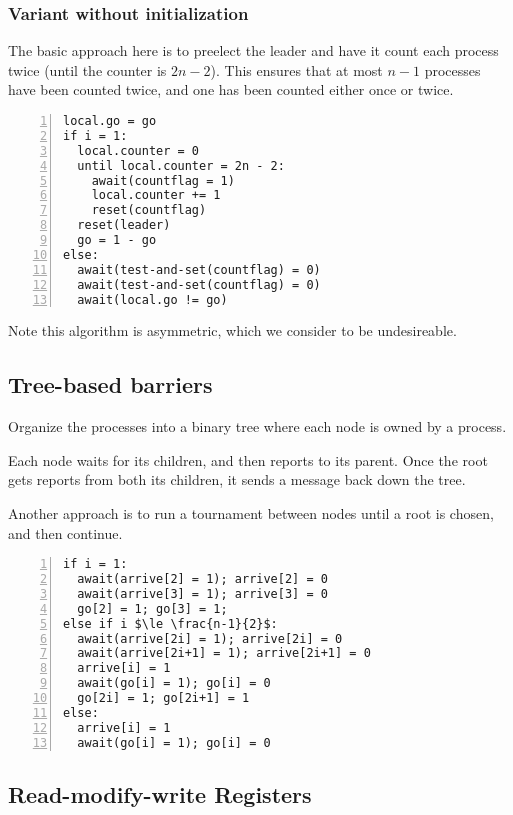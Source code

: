 \documentclass{idc_msc}
\begin{document}
\subsubsection{Variant without initialization}

The basic approach here is to preelect the leader and have it count each process twice (until the counter is $2n-2$).
This ensures that at most $n-1$ processes have been counted twice, and one has been counted either once or twice.

\begin{lstlisting}[frame=L,mathescape=true,numbers=left,title={For process i in 0...n}]
local.go = go
if i = 1:
  local.counter = 0
  until local.counter = 2n - 2:
    await(countflag = 1)
    local.counter += 1
    reset(countflag)
  reset(leader)
  go = 1 - go
else:
  await(test-and-set(countflag) = 0)
  await(test-and-set(countflag) = 0)
  await(local.go != go)
\end{lstlisting}

Note this algorithm is asymmetric, which we consider to be undesireable.

\subsection{Tree-based barriers}

Organize the processes into a binary tree where each node is owned by a process.

Each node waits for its children, and then reports to its parent.
Once the root gets reports from both its children, it sends a message back down the tree.

Another approach is to run a tournament between nodes until a root is chosen, and then continue.

\begin{lstlisting}[frame=L,mathescape=true,numbers=left,title={For process i in 0...n}]
if i = 1:
  await(arrive[2] = 1); arrive[2] = 0
  await(arrive[3] = 1); arrive[3] = 0
  go[2] = 1; go[3] = 1;
else if i $\le \frac{n-1}{2}$:
  await(arrive[2i] = 1); arrive[2i] = 0
  await(arrive[2i+1] = 1); arrive[2i+1] = 0
  arrive[i] = 1
  await(go[i] = 1); go[i] = 0
  go[2i] = 1; go[2i+1] = 1
else:
  arrive[i] = 1
  await(go[i] = 1); go[i] = 0   
\end{lstlisting}


\subsection{Read-modify-write Registers}
\end{document}
